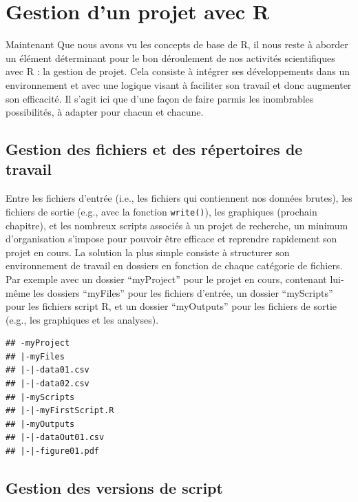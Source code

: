 \documentclass[]{book}
\begin{document}
\hypertarget{project}{%
\chapter{Gestion d'un projet avec R}\label{project}}

Maintenant Que nous avons vu les concepts de base de R, il nous reste à aborder un élément déterminant pour le bon déroulement de nos activités scientifiques avec R : la gestion de projet. Cela consiste à intégrer ses développements dans un environnement et avec une logique visant à faciliter son travail et donc augmenter son efficacité. Il s'agit ici que d'une façon de faire parmis les inombrables possibilités, à adapter pour chacun et chacune.

\hypertarget{gestion-des-fichiers-et-des-repertoires-de-travail}{%
\section{Gestion des fichiers et des répertoires de travail}\label{gestion-des-fichiers-et-des-repertoires-de-travail}}

Entre les fichiers d'entrée (i.e., les fichiers qui contiennent nos données brutes), les fichiers de sortie (e.g., avec la fonction \texttt{write()}), les graphiques (prochain chapitre), et les nombreux scripts associés à un projet de recherche, un minimum d'organisation s'impose pour pouvoir être efficace et reprendre rapidement son projet en cours. La solution la plus simple consiste à structurer son environnement de travail en dossiers en fonction de chaque catégorie de fichiers. Par exemple avec un dossier ``myProject'' pour le projet en cours, contenant lui-même les dossiers ``myFiles'' pour les fichiers d'entrée, un dossier ``myScripts'' pour les fichiers script R, et un dossier ``myOutputs'' pour les fichiers de sortie (e.g., les graphiques et les analyses).

\begin{verbatim}
## -myProject
## |-myFiles
## |-|-data01.csv
## |-|-data02.csv
## |-myScripts
## |-|-myFirstScript.R
## |-myOutputs
## |-|-dataOut01.csv
## |-|-figure01.pdf
\end{verbatim}

\hypertarget{gestion-des-versions-de-script}{%
\section{Gestion des versions de script}\label{gestion-des-versions-de-script}}
\end{document}
